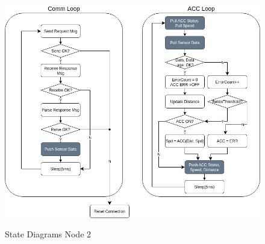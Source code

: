 \begin{figure}[h]
	\includegraphics[height=100mm]{images/StateDiagramNode2.png}
	\centering
	\caption{State Diagrams Node 2}
	\label{fig:stateDiagramNode2}
\end{figure}
